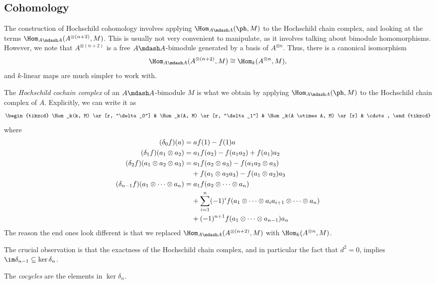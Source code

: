 \documentclass[a4paper]{article}
\begin{document}
\subsection{Cohomology}
The construction of Hochschild cohomology involves applying $\Hom_{A\mdash A}(\ph, M)$ to the Hochschild chain complex, and looking at the terms $\Hom_{A\mdash A}(A^{\otimes(n + 2)}, M)$. This is usually not very convenient to manipulate, as it involves talking about bimodule homomorphisms. However, we note that $A^{\otimes (n + 2)}$ is a free $A\mdash A$-bimodule generated by a basis of $A^{\otimes n}$. Thus, there is a canonical isomorphism
\[
  \Hom_{A \mdash A}(A^{\otimes (n + 2)}, M)\cong \Hom_k(A^{\otimes n}, M),
\]
and $k$-linear maps are much simpler to work with.

\begin{defi}
  The \emph{Hochschild cochain complex} of an $A\mdash A$-bimodule $M$ is what we obtain by applying $\Hom_{A\mdash A}(\ph, M)$ to the Hochschild chain complex of $A$. Explicitly, we can write it as
  \[
    \begin{tikzcd}
      \Hom_k(k, M) \ar[r, "\delta_0"] & \Hom_k(A, M) \ar[r, "\delta_1"] & \Hom_k(A \otimes A, M) \ar[r] & \cdots,
    \end{tikzcd}
  \]
  where
  \begin{align*}
    (\delta_0 f)(a) &= a f(1) - f(1) a\\
    (\delta_1 f)(a_1 \otimes a_2) &= a_1 f(a_2) - f(a_1 a_2) + f(a_1) a_2\\
    (\delta_2 f)(a_1 \otimes a_2 \otimes a_3) &= a_1 f(a_2 \otimes a_3) - f(a_1a_2 \otimes a_3) \\
    &\hphantom{={}}+ f(a_1 \otimes a_2 a_3) - f(a_1 \otimes a_2)a_3\\
    (\delta_{n - 1} f)(a_1 \otimes \cdots \otimes a_n) &= a_1 f(a_2 \otimes \cdots \otimes a_n)\\
    &\hphantom{={}}+ \sum_{i = 1}^n (-1)^i f(a_1 \otimes \cdots \otimes a_i a_{i + 1} \otimes \cdots \otimes a_n) \\
    &\hphantom{={}}+ (-1)^{n + 1} f(a_1 \otimes \cdots \otimes a_{n - 1})a_n
  \end{align*}
  The reason the end ones look different is that we replaced $\Hom_{A\mdash A}(A^{\otimes (n + 2)}, M)$ with $\Hom_k(A^{\otimes n}, M)$.
\end{defi}

The crucial observation is that the exactness of the Hochschild chain complex, and in particular the fact that $d^2 = 0$, implies $\im \delta_{n - 1} \subseteq \ker \delta_n$.
\begin{defi}[Cocycles]
  The \emph{cocycles} are the elements in $\ker \delta_n$.
\end{defi}
\end{document}
